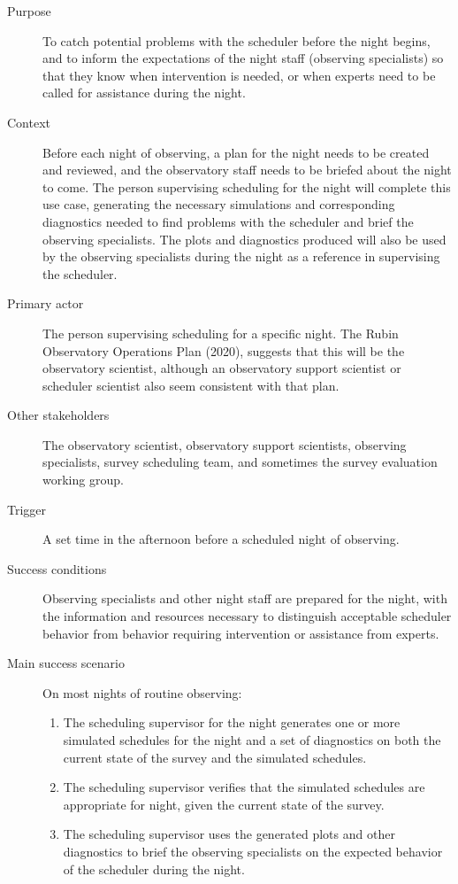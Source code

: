 \begin{description}
\item[{Purpose}] To catch potential problems with the scheduler before the night begins, and to inform the expectations of the night staff (observing specialists) so that they know when intervention is needed, or when experts need to be called for assistance during the night.
\item[{Context}] Before each night of observing, a plan for the night needs to be created and reviewed, and the observatory staff needs to be briefed about the night to come. The person supervising scheduling for the night will complete this use case, generating the necessary simulations and corresponding diagnostics needed to find problems with the scheduler and brief the observing specialists. The plots and diagnostics produced will also be used by the observing specialists during the night as a reference in supervising the scheduler.
\item[{Primary actor}] The person supervising scheduling for a specific night. The Rubin Observatory Operations Plan (2020), suggests that this will be the observatory scientist, although an observatory support scientist or scheduler scientist also seem consistent with that plan.
\item[{Other stakeholders}] The observatory scientist, observatory support scientists, observing specialists, survey scheduling team, and sometimes the survey evaluation working group.
\item[{Trigger}] A set time in the afternoon before a scheduled night of observing.
\item[{Success conditions}] Observing specialists and other night staff are prepared for the night, with the information and resources necessary to distinguish acceptable scheduler behavior from behavior requiring intervention or assistance from experts.
\item[{Main success scenario}] On most nights of routine observing:
\begin{enumerate}
\item The scheduling supervisor for the night generates one or more simulated schedules for the night and a set of diagnostics on both the current state of the survey and the simulated schedules.
\item The scheduling supervisor verifies that the simulated schedules are appropriate for night, given the current state of the survey.
\item The scheduling supervisor uses the generated plots and other diagnostics to brief the observing specialists on the expected behavior of the scheduler during the night.

\end{enumerate}
\end{description}
